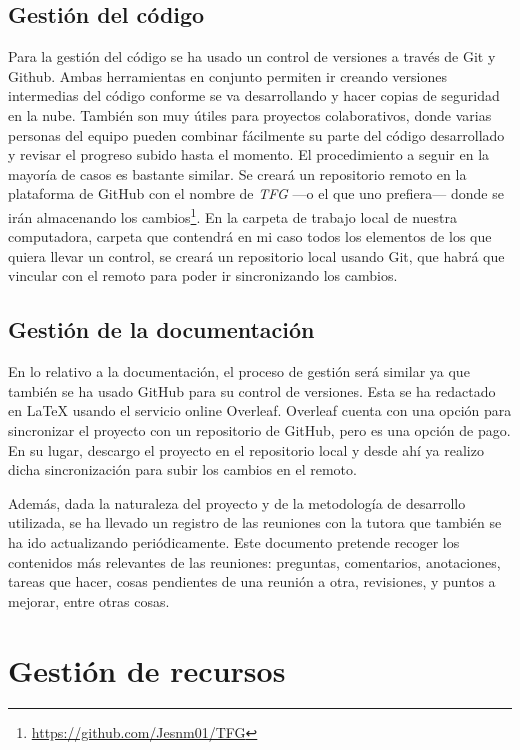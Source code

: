 \subsection{Gestión del código}
Para la gestión del código se ha usado un control de versiones a través de Git y Github. Ambas herramientas en conjunto permiten ir creando versiones intermedias del código conforme se va desarrollando y hacer copias de seguridad en la nube. También son muy útiles para proyectos colaborativos, donde varias personas del equipo pueden combinar fácilmente su parte del código desarrollado y revisar el progreso subido hasta el momento.
El procedimiento a seguir en la mayoría de casos es bastante similar. Se creará un repositorio remoto en la plataforma de GitHub con el nombre de \emph{TFG} —o el que uno prefiera— donde se irán almacenando los cambios\footnote{\url{https://github.com/Jesnm01/TFG}}. En la carpeta de trabajo local de nuestra computadora, carpeta que contendrá en mi caso todos los elementos de los que quiera llevar un control, se creará un repositorio local usando Git, que habrá que vincular con el remoto para poder ir sincronizando los cambios. 


\subsection{Gestión de la documentación}
En lo relativo a la documentación, el proceso de gestión será similar ya que también se ha usado GitHub para su control de versiones. Esta se ha redactado en LaTeX usando el servicio online Overleaf. Overleaf cuenta con una opción para sincronizar el proyecto con un repositorio de GitHub, pero es una opción de pago. En su lugar, descargo el proyecto en el repositorio local y desde ahí ya realizo dicha sincronización para subir los cambios en el remoto.

Además, dada la naturaleza del proyecto y de la metodología de desarrollo utilizada, se ha llevado un registro de las reuniones con la tutora que también se ha ido actualizando periódicamente. Este documento pretende recoger los contenidos más relevantes de las reuniones: preguntas, comentarios, anotaciones, tareas que hacer, cosas pendientes de una reunión a otra, revisiones, y puntos a mejorar, entre otras cosas.



\section{Gestión de recursos} \label{gestion_recursos}

